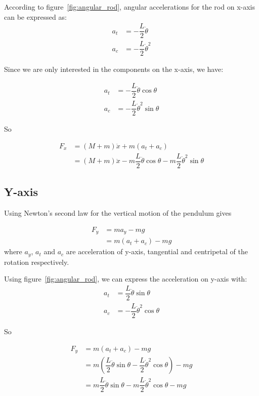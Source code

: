 \documentclass{notes}
\begin{document}
According to figure~\ref{fig:angular_rod}, angular accelerations for the rod on x-axis can be
expressed as:
\begin{align*}
  a_t & = -\dfrac{L}{2} \ddot{\theta} \\
  a_c & = -\dfrac{L}{2} \dot{\theta}^2
\end{align*}

Since we are only interested in the components on the x-axis, we have:

\begin{align*}
  a_t & = -\dfrac{L}{2} \ddot{\theta} \cos \theta \\
  a_c & = -\dfrac{L}{2} \dot{\theta}^2 \sin \theta
\end{align*}

So 

\begin{align}
  F_x & = (M+m) \ddot{x} + m (a_{t} + a_{c})\nonumber\\
         & = (M+m) \ddot{x} -m\dfrac{L}{2} \ddot{\theta} \cos \theta 
                        -m\dfrac{L}{2} \dot{\theta}^2 \sin \theta 
\end{align}
\FloatBarrier


\subsection{Y-axis}
Using Newton's second law for the vertical motion of the pendulum gives

\begin{align*}
  F_y & = ma_y - mg \\
      & = m(a_t + a_c) - mg
\end{align*}
where $a_y$, $a_t$ and $a_c$ are acceleration of y-axis, tangential and centripetal of the rotation
respectively. 

Using figure~\ref{fig:angular_rod}, we can express the acceleration on y-axis with:
\begin{align*}
  a_t & = \dfrac{L}{2}\ddot{\theta}\sin\theta \\
  a_c & = -\dfrac{L}{2}\dot{\theta}^2\cos\theta
\end{align*}

So

\begin{align}
  F_y & = m(a_t + a_c) - mg \nonumber\\
      & = m(\dfrac{L}{2}\ddot{\theta}\sin\theta - \dfrac{L}{2}\dot{\theta}^2\cos\theta) - mg
      \nonumber\\ 
      & = m\dfrac{L}{2}\ddot{\theta}\sin\theta - m\dfrac{L}{2}\dot{\theta}^2\cos\theta - mg
       \label{eqn:f_y}
\end{align}
\end{document}
